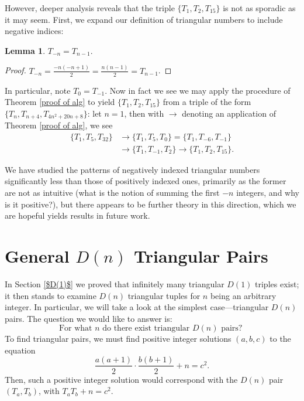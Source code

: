 \documentclass[12pt]{amsart}
\theoremstyle{theorem}
\theoremstyle{definition}
\newtheorem{lemma}[theorem]{Lemma}
\theoremstyle{plain}
\begin{document}
However, deeper analysis reveals that the triple $\{T_1, T_2, T_{15} \}$ is not as sporadic as it may seem. First, we expand our definition of triangular numbers to include negative indices:

\begin{lemma}
    $T_{-n}=T_{n-1}$.
\end{lemma}
\begin{proof}
    $T_{-n}=\frac{-n(-n+1)}{2}=\frac{n(n-1)}{2}=T_{n-1}$.
\end{proof}

In particular, note $T_0=T_{-1}$. Now in fact we see we may apply the procedure of Theorem \ref{proof of alg} to yield $\{T_1,T_2,T_{15}\}$ from a triple of the form $\{T_n,T_{n+4},T_{4n^2 + 20n + 8}\}$: let $n=1$, then with $\to$ denoting an application of Theorem \ref{proof of alg}, we see \begin{align*}\{T_1, T_5, T_{32} \} &\to \{T_1,T_5,T_0\}=\{T_1,T_{-6},T_{-1}\}\\ &\to\{T_{1},T_{-1},T_{2} \} \to\{T_1,T_2,T_{15}\}.\end{align*}

We have studied the patterns of negatively indexed triangular numbers significantly less than those of positively indexed ones, primarily as the former are not as intuitive (what is the notion of summing the first $-n$ integers, and why is it positive?), but there appears to be further theory in this direction, which we are hopeful yields results in future work.

\section{General $D(n)$ Triangular Pairs} \label{$D(2)$}

In Section \ref{$D(1)$} we proved that infinitely many triangular $D(1)$ triples exist; it then stands to examine $D(n)$ triangular tuples for $n$ being an arbitrary integer. In particular, we will take a look at the simplest case---triangular $D(n)$ pairs. The question we would like to answer is:
$$\text{For what } n \text{ do there exist triangular } D(n) \text{ pairs? }$$ 
To find triangular pairs, we must find positive integer solutions $(a,b,c)$ to the equation 
$$\frac{a(a+1)}{2} \cdot \frac{b(b+1)}{2} + n = c^2.$$
Then, such a positive integer solution would correspond with the $D(n)$ pair $(T_a, T_b)$, with $T_a T_b + n = c^2$.
\end{document}
